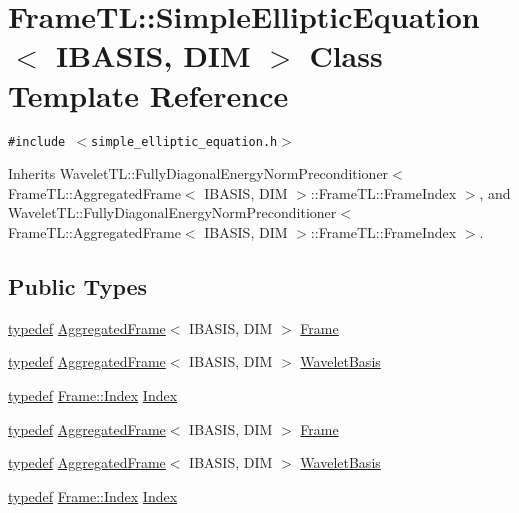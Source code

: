 \hypertarget{classFrameTL_1_1SimpleEllipticEquation}{
\section{FrameTL::SimpleEllipticEquation$<$ IBASIS, DIM $>$ Class Template Reference}
\label{classFrameTL_1_1SimpleEllipticEquation}
}
{\tt \#include $<$simple\_\-elliptic\_\-equation.h$>$}

Inherits WaveletTL::FullyDiagonalEnergyNormPreconditioner$<$ FrameTL::AggregatedFrame$<$ IBASIS, DIM $>$::FrameTL::FrameIndex $>$, and WaveletTL::FullyDiagonalEnergyNormPreconditioner$<$ FrameTL::AggregatedFrame$<$ IBASIS, DIM $>$::FrameTL::FrameIndex $>$.

\subsection*{Public Types}
\begin{CompactItemize}
\item 
\hyperlink{structtypedef}{typedef} \hyperlink{classFrameTL_1_1AggregatedFrame}{AggregatedFrame}$<$ IBASIS, DIM $>$ \hyperlink{classFrameTL_1_1SimpleEllipticEquation_b048afa8f64d6e76d33b1ae60686010a}{Frame}
\item 
\hyperlink{structtypedef}{typedef} \hyperlink{classFrameTL_1_1AggregatedFrame}{AggregatedFrame}$<$ IBASIS, DIM $>$ \hyperlink{classFrameTL_1_1SimpleEllipticEquation_59ee36b9fe6e6aab5b0947de8487c95e}{WaveletBasis}
\item 
\hyperlink{structtypedef}{typedef} \hyperlink{classFrameTL_1_1FrameIndex}{Frame::Index} \hyperlink{classFrameTL_1_1SimpleEllipticEquation_763214b72b98926356eebe8b7f6da678}{Index}
\item 
\hyperlink{structtypedef}{typedef} \hyperlink{classFrameTL_1_1AggregatedFrame}{AggregatedFrame}$<$ IBASIS, DIM $>$ \hyperlink{classFrameTL_1_1SimpleEllipticEquation_b048afa8f64d6e76d33b1ae60686010a}{Frame}
\item 
\hyperlink{structtypedef}{typedef} \hyperlink{classFrameTL_1_1AggregatedFrame}{AggregatedFrame}$<$ IBASIS, DIM $>$ \hyperlink{classFrameTL_1_1SimpleEllipticEquation_59ee36b9fe6e6aab5b0947de8487c95e}{WaveletBasis}
\item 
\hyperlink{structtypedef}{typedef} \hyperlink{classFrameTL_1_1FrameIndex}{Frame::Index} \hyperlink{classFrameTL_1_1SimpleEllipticEquation_763214b72b98926356eebe8b7f6da678}{Index}
\end{CompactItemize}
